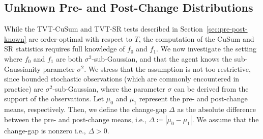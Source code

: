 \documentclass[12pt]{interact}
\newcommand{\lp}{\left(}
\newcommand{\rp}{\right)}
\newcommand{\lb}{\left[}
\newcommand{\rb}{\right]}
\newcommand{\lbp}{\left\{}
\newcommand{\rbp}{\right\}}
\newcommand{\lba}{\left\lvert}
\newcommand{\rba}{\right\rvert}
\newcommand{\mcal}{\mathcal}
\newcommand{\mrm}{\mathrm}
\theoremstyle{plain}
\newtheorem{remark}{Remark}
\begin{document}


\subsection{Unknown Pre- and Post-Change Distributions}
\label{sec:pre-post-unknown}

While the TVT-CuSum and TVT-SR tests described in Section~\ref{sec:pre-post-known}  are order-optimal with respect to $T$, the computation of the CuSum and SR statistics requires full knowledge of $f_{0}$ and $f_{1}$.
%
We now investigate the setting where $f_{0}$ and $f_{1}$ are both $\sigma^{2}$-sub-Gaussian, and that the agent knows the sub-Gaussianity parameter $\sigma^{2}$.
We stress that the assumption is not too restrictive, since bounded stochastic observations (which are commonly encountered in practice) are $\sigma^{2}$-sub-Gaussian, where the parameter $\sigma$ can be derived from the support of the observations.
Let $\mu_{0}$ and $\mu_{1}$ represent the pre- and post-change means, respectively. Then, we define the change-gap $\Delta$ as the absolute difference between the pre- and post-change means, i.e., $\Delta \coloneqq \lba \mu_{0} - \mu_{1} \rba$. We assume that the change-gap is nonzero i.e., $\Delta>0$.
\end{document}

